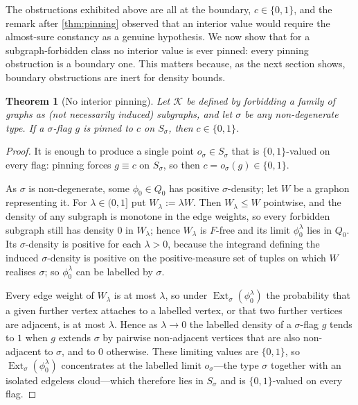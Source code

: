 \documentclass[11pt]{article}
\newtheorem{theorem}{Theorem}
\theoremstyle{definition}
\newcommand{\K}{\mathcal{K}}
\newcommand{\Ext}{\operatorname{Ext}}
\begin{document}
The obstructions exhibited above are all at the boundary, $c\in\{0,1\}$, and the remark
after \cref{thm:pinning} observed that an interior value would require the almost-sure
constancy as a genuine hypothesis.  We now show that for a subgraph-forbidden class no
interior value is ever pinned: every pinning obstruction is a boundary one.  This matters
because, as the next section shows, boundary obstructions are inert for density bounds.

\begin{theorem}[No interior pinning]\label{thm:no-interior}
Let $\K$ be defined by forbidding a family of graphs as (not necessarily induced)
subgraphs, and let $\sigma$ be any non-degenerate type.  If a $\sigma$-flag $g$ is pinned
to $c$ on $S_\sigma$, then $c\in\{0,1\}$.
\end{theorem}

\begin{proof}
It is enough to produce a single point $o_\sigma\in S_\sigma$ that is $\{0,1\}$-valued on
every flag: pinning forces $g\equiv c$ on $S_\sigma$, so then $c=o_\sigma(g)\in\{0,1\}$.

As $\sigma$ is non-degenerate, some $\phi_0\in Q_0$ has positive $\sigma$-density; let $W$
be a graphon representing it.  For $\lambda\in(0,1]$ put $W_\lambda:=\lambda W$.  Then
$W_\lambda\le W$ pointwise, and the density of any subgraph is monotone in the edge
weights, so every forbidden subgraph still has density $0$ in $W_\lambda$; hence
$W_\lambda$ is $F$-free and its limit $\phi_0^{\lambda}$ lies in $Q_0$.  Its
$\sigma$-density is positive for each $\lambda>0$, because the integrand defining the
induced $\sigma$-density is positive on the positive-measure set of tuples on which $W$
realises $\sigma$; so $\phi_0^{\lambda}$ can be labelled by $\sigma$.

Every edge weight of $W_\lambda$ is at most $\lambda$, so under
$\Ext_\sigma(\phi_0^{\lambda})$ the probability that a given further vertex attaches to
a labelled vertex, or that two further vertices are adjacent, is at most $\lambda$.  Hence as
$\lambda\to0$ the labelled density of a $\sigma$-flag $g$ tends to $1$ when $g$ extends
$\sigma$ by pairwise non-adjacent vertices that are also non-adjacent to $\sigma$, and to
$0$ otherwise.  These limiting values are $\{0,1\}$, so $\Ext_\sigma(\phi_0^{\lambda})$
concentrates at the labelled limit $o_\sigma$---the type $\sigma$ together with an isolated
edgeless cloud---which therefore lies in $S_\sigma$ and is $\{0,1\}$-valued on every flag.
\end{proof}
\end{document}

